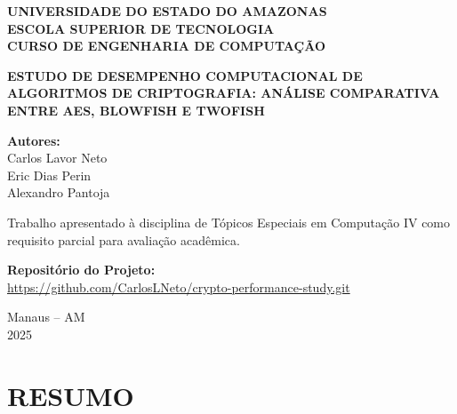 \documentclass[12pt,a4paper,oneside]{article}
\begin{document}
\begin{titlepage}
\centering
\vspace*{1cm}

{\fontsize{14}{16}\selectfont\bfseries\uppercase{Universidade do Estado do Amazonas}}\\
{\fontsize{14}{16}\selectfont\bfseries\uppercase{Escola Superior de Tecnologia}}\\
{\fontsize{14}{16}\selectfont\bfseries\uppercase{Curso de Engenharia de Computação}}\\

\vspace{4cm}

{\fontsize{14}{16}\selectfont\bfseries\uppercase{Estudo de Desempenho Computacional de Algoritmos de Criptografia: Análise Comparativa entre AES, Blowfish e Twofish}}

\vspace{4cm}

{\fontsize{12}{14}\selectfont
\textbf{Autores:}\\
Carlos Lavor Neto\\
Eric Dias Perin\\
Alexandro Pantoja\\
}

\vspace{2cm}

{\fontsize{12}{14}\selectfont
Trabalho apresentado à disciplina de Tópicos Especiais em Computação IV como requisito parcial para avaliação acadêmica.

\vspace{0.5cm}
\textbf{Repositório do Projeto:}\\
\url{https://github.com/CarlosLNeto/crypto-performance-study.git}
}

\vfill

{\fontsize{12}{14}\selectfont
Manaus -- AM\\
2025
}

\end{titlepage}

\newpage
\section*{RESUMO}
\end{document}
